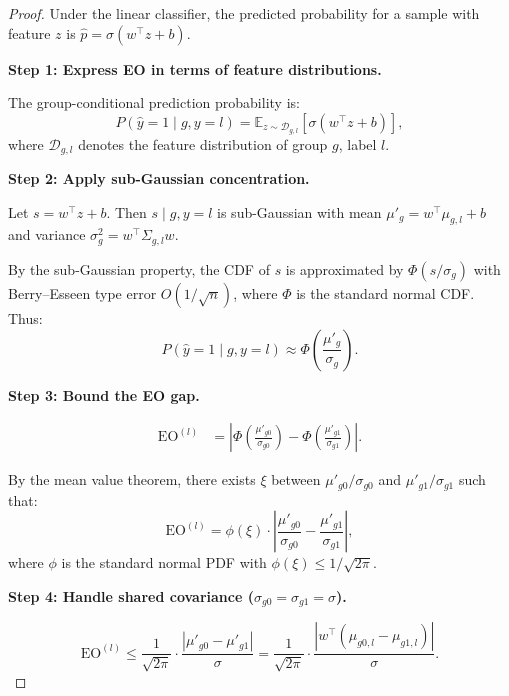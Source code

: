 \documentclass[11pt]{article}
\begin{document}
\begin{proof}
    Under the linear classifier, the predicted probability for a sample with feature $z$ is $\hat{p} = \sigma(w^\top z + b)$.

    \textbf{Step 1: Express EO in terms of feature distributions.}

    The group-conditional prediction probability is:
    \begin{equation}
        P(\hat{y}=1 \mid g, y=l) = \mathbb{E}_{z \sim \mathcal{D}_{g,l}}\left[\sigma(w^\top z + b)\right],
    \end{equation}
    where $\mathcal{D}_{g,l}$ denotes the feature distribution of group $g$, label $l$.

    \textbf{Step 2: Apply sub-Gaussian concentration.}

    Let $s = w^\top z + b$. Then $s \mid g, y=l$ is sub-Gaussian with mean $\mu'_g = w^\top \mu_{g,l} + b$ and variance $\sigma_g^2 = w^\top \Sigma_{g,l} w$.

    By the sub-Gaussian property, the CDF of $s$ is approximated by $\Phi(s/\sigma_g)$ with Berry--Esseen type error $O(1/\sqrt{n})$, where $\Phi$ is the standard normal CDF. Thus:
    \begin{equation}
        P(\hat{y}=1 \mid g, y=l) \approx \Phi\!\left(\frac{\mu'_g}{\sigma_g}\right).
    \end{equation}

    \textbf{Step 3: Bound the EO gap.}

    \begin{align}
        \mathrm{EO}^{(l)} &= \left|\Phi\!\left(\frac{\mu'_{g0}}{\sigma_{g0}}\right) - \Phi\!\left(\frac{\mu'_{g1}}{\sigma_{g1}}\right)\right|.
    \end{align}

    By the mean value theorem, there exists $\xi$ between $\mu'_{g0}/\sigma_{g0}$ and $\mu'_{g1}/\sigma_{g1}$ such that:
    \begin{equation}
        \mathrm{EO}^{(l)} = \phi(\xi) \cdot \left|\frac{\mu'_{g0}}{\sigma_{g0}} - \frac{\mu'_{g1}}{\sigma_{g1}}\right|,
    \end{equation}
    where $\phi$ is the standard normal PDF with $\phi(\xi) \leq 1/\sqrt{2\pi}$.

    \textbf{Step 4: Handle shared covariance ($\sigma_{g0} = \sigma_{g1} = \sigma$).}

    \begin{equation}
        \mathrm{EO}^{(l)} \leq \frac{1}{\sqrt{2\pi}} \cdot \frac{|\mu'_{g0} - \mu'_{g1}|}{\sigma} = \frac{1}{\sqrt{2\pi}} \cdot \frac{|w^\top(\mu_{g0,l} - \mu_{g1,l})|}{\sigma}.
    \end{equation}


\end{proof}
\end{document}
